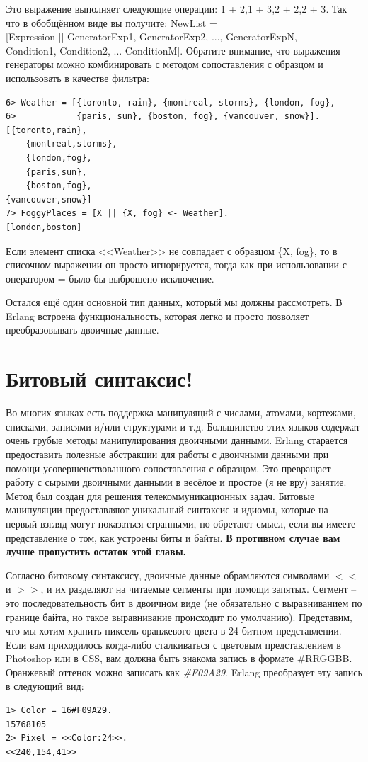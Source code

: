 \documentclass[a4paper,12pt]{report}
\newcommand{\ops}{\colorbox{lgreen}}
\begin{document}
Это выражение выполняет следующие операции: \ops{1 + 2},\ops{1 + 3},\ops{2 + 2},\ops{2 + 3}. Так что в обобщённом виде вы получите: \ops{NewList = }\\ 
\ops{[Expression || GeneratorExp1, GeneratorExp2, ..., GeneratorExpN,}\\ 
\ops{Condition1, Condition2, ... ConditionM]}. Обратите внимание, что выражения\--генераторы можно комбинировать с методом сопоставления с образцом и использовать в качестве фильтра:
\begin{lstlisting}[style=repl]
6> Weather = [{toronto, rain}, {montreal, storms}, {london, fog},  
6>            {paris, sun}, {boston, fog}, {vancouver, snow}].
[{toronto,rain},
    {montreal,storms},
    {london,fog},
    {paris,sun},
    {boston,fog},
{vancouver,snow}]
7> FoggyPlaces = [X || {X, fog} <- Weather].
[london,boston]
\end{lstlisting}

Если элемент списка <<Weather>> не совпадает с образцом \{X, fog\}, то в списочном выражении он просто игнорируется, тогда как при использовании с оператором \ops{=} было бы выброшено исключение.

Остался ещё один основной тип данных, который мы должны рассмотреть. В Erlang встроена функциональность, которая легко и просто позволяет преобразовывать двоичные данные.
\section{Битовый синтаксис!}
Во многих языках есть поддержка манипуляций с числами, атомами, кортежами, списками, записями и/или структурами и т.д. Большинство этих языков содержат очень грубые методы манипулирования двоичными данными. Erlang старается предоставить полезные абстракции для работы с двоичными данными при помощи усовершенствованного сопоставления с образцом. Это превращает работу с сырыми двоичными данными в весёлое и простое (я не вру) занятие. Метод был создан для решения телекоммуникационных задач. Битовые манипуляции предоставляют уникальный синтаксис и идиомы, которые на первый взгляд могут показаться странными, но обретают смысл, если вы имеете представление о том, как устроены биты и байты. \textbf{В противном случае вам лучше пропустить остаток этой главы.}

Согласно битовому синтаксису, двоичные данные обрамляются символами $<<$ и $>>$, и их разделяют на читаемые сегменты при помощи запятых. Сегмент \--- это последовательность бит в двоичном виде (не обязательно с выравниванием по границе байта, но такое выравнивание происходит по умолчанию). Представим, что мы хотим хранить пиксель оранжевого цвета в 24\--битном представлении. Если вам приходилось когда\--либо сталкиваться с цветовым представлением в Photoshop или в CSS, вам должна быть знакома запись в формате \#RRGGBB. Оранжевый оттенок можно записать как \emph{\#F09A29}. Erlang преобразует эту запись в следующий вид:
\begin{lstlisting}[style=repl]
1> Color = 16#F09A29.
15768105
2> Pixel = <<Color:24>>.
<<240,154,41>>
\end{lstlisting}
\end{document}
